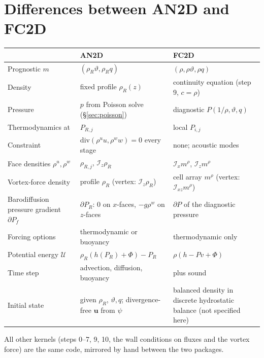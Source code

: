 \documentclass[11pt,a4paper]{article}
\newcommand{\vt}{\vartheta}                    %
\newcommand{\bu}{\mathbf{u}}
\newcommand{\Ix}{\mathcal{I}_x}
\newcommand{\Iz}{\mathcal{I}_z}
\newcommand{\Ixz}{\mathcal{I}_{xz}}
\begin{document}
\section{Differences between AN2D and FC2D}\label{sec:diff}
\begin{center}\small
\begin{tabular}{p{3.2cm}p{5.8cm}p{5.8cm}}
\hline
 & AN2D & FC2D \\ \hline
Prognostic $m$ & $(\rho_R\vt,\rho_Rq)$ & $(\rho,\rho\vt,\rho q)$ \\
Density & fixed profile $\rho_R(z)$ & continuity equation (step 9, $c=\rho$) \\
Pressure & $p$ from Poisson solve (\S\ref{sec:poisson}) & diagnostic $P(1/\rho,\vt,q)$ \\
Thermodynamics at & $P_{R,j}$ & local $P_{i,j}$ \\
Constraint & $\mathrm{div}(\rho^uu,\rho^ww)=0$ every stage & none; acoustic modes \\
Face densities $\rho^u,\rho^w$ & $\rho_{R,j}$, $\Iz\rho_R$ & $\Ix m^\rho$, $\Iz m^\rho$ \\
Vortex-force density & profile $\rho_R$ (vertex: $\Iz\rho_R$) & cell array $m^\rho$ (vertex: $\Ixz m^\rho$) \\
Barodiffusion pressure gradient $\partial P_f$ & $\partial P_R$: $0$ on $x$-faces, $-g\rho^w$ on $z$-faces & $\partial P$ of the diagnostic pressure \\
Forcing options & thermodynamic or buoyancy & thermodynamic only \\
Potential energy $\mathcal U$ & $\rho_R(h(P_R)+\Phi)-P_R$ & $\rho(h-Pv+\Phi)$ \\
Time step & advection, diffusion, buoyancy & plus sound \\
Initial state & given $\rho_R$, $\vt,q$; divergence-free $\bu$ from $\psi$ & balanced density in discrete hydrostatic balance (not specified here) \\ \hline
\end{tabular}
\end{center}
All other kernels (steps 0--7, 9, 10, the wall conditions on fluxes and the vortex force) are the same code, mirrored by hand between the two packages.

\appendix
\end{document}
